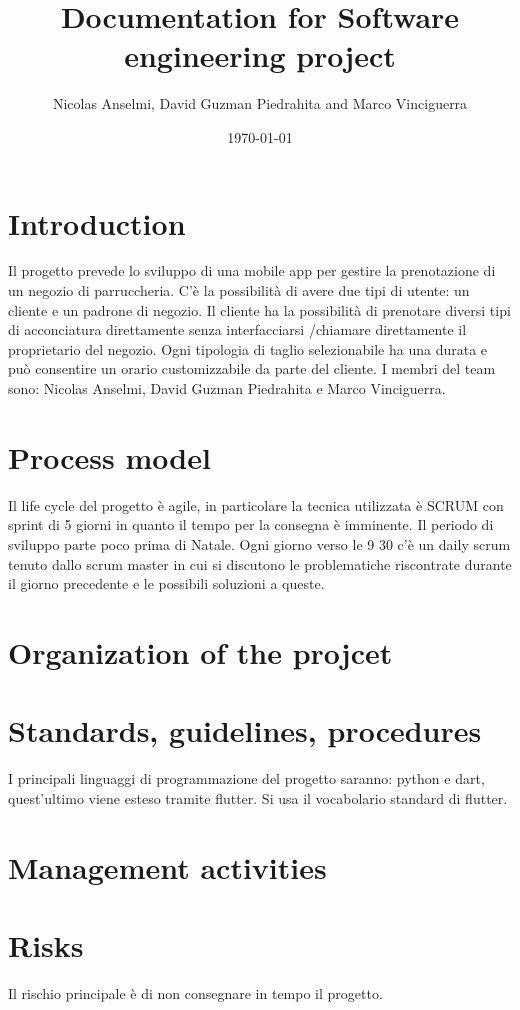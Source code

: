 \documentclass{article}
\title{Documentation for Software engineering project}
\author{Nicolas Anselmi, David Guzman Piedrahita and Marco Vinciguerra}
\date{\today}
\begin{document}
\maketitle

\section{Introduction}
Il progetto prevede lo sviluppo di una mobile app per gestire la prenotazione di 
un negozio di parruccheria. C'è la possibilità di avere due tipi di utente:
un cliente e un padrone di negozio. Il cliente ha la possibilità di prenotare diversi 
tipi di acconciatura direttamente senza interfacciarsi /chiamare direttamente il proprietario
del negozio. Ogni tipologia di taglio selezionabile ha una durata e può consentire un orario customizzabile 
da parte del cliente.
I membri del team sono: Nicolas Anselmi, David Guzman Piedrahita e Marco Vinciguerra.

\section{Process model}
Il life cycle del progetto è agile, in particolare la tecnica utilizzata è SCRUM con
sprint di 5 giorni in quanto il tempo per la consegna è imminente. Il periodo di sviluppo parte
poco prima di Natale. Ogni giorno verso le 9 30 
c'è un daily scrum tenuto dallo scrum master in cui si discutono le problematiche riscontrate durante 
il giorno precedente e le possibili soluzioni a queste.

\section{Organization of the projcet}

\section{Standards, guidelines, procedures}
I principali linguaggi di programmazione del progetto saranno: python e dart, quest'ultimo
viene esteso tramite flutter.
Si usa il vocabolario standard di flutter.

\section{Management activities}

\section{Risks}
Il rischio principale è di non consegnare in tempo il progetto.
\end{document}
